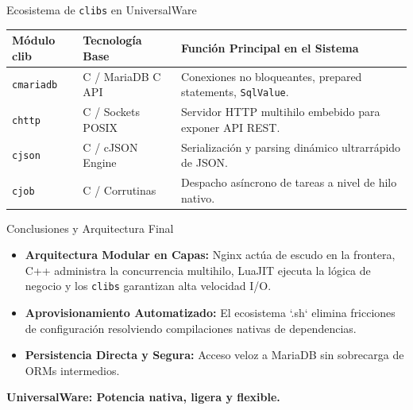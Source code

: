 \documentclass[10pt,aspectratio=169]{beamer}
\begin{document}
\begin{frame}{Ecosistema de \texttt{clibs} en UniversalWare}
\centering
\small
\begin{tabular}{lll}
\toprule
\textbf{Módulo clib} & \textbf{Tecnología Base} & \textbf{Función Principal en el Sistema} \\
\midrule
\texttt{cmariadb} & C / MariaDB C API & Conexiones no bloqueantes, prepared statements, \texttt{SqlValue}. \\
\texttt{chttp} & C / Sockets POSIX & Servidor HTTP multihilo embebido para exponer API REST. \\
\texttt{cjson} & C / cJSON Engine & Serialización y parsing dinámico ultrarrápido de JSON. \\
\texttt{cjob} & C / Corrutinas & Despacho asíncrono de tareas a nivel de hilo nativo. \\
\bottomrule
\end{tabular}
\end{frame}

\begin{frame}{Conclusiones y Arquitectura Final}
    \begin{itemize}
        \item \textbf{Arquitectura Modular en Capas:} Nginx actúa de escudo en la frontera, C++ administra la concurrencia multihilo, LuaJIT ejecuta la lógica de negocio y los \texttt{clibs} garantizan alta velocidad I/O.
        \item \textbf{Aprovisionamiento Automatizado:} El ecosistema `.sh` elimina fricciones de configuración resolviendo compilaciones nativas de dependencias.
        \item \textbf{Persistencia Directa y Segura:} Acceso veloz a MariaDB sin sobrecarga de ORMs intermedios.
    \end{itemize}
    
    \vspace{0.8cm}
    \centering
    \Large\textbf{\color{accentblue} UniversalWare: Potencia nativa, ligera y flexible.}
\end{frame}
\end{document}
